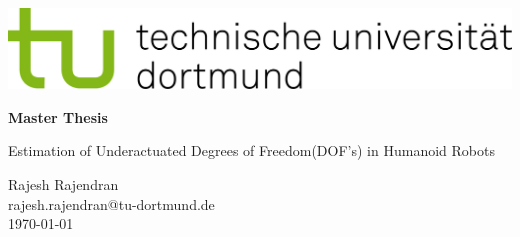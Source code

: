 \documentclass[a4paper,11pt,twoside,DIV10,english,numbers=noendperiod]{scrbook}
\newcommand{\changefont}[3]{
\fontfamily{#1} \fontseries{#2} \fontshape{#3} \selectfont}
\theoremstyle{change}
\theoremstyle{nonumberplain}
\theoremstyle{change}
\theoremstyle{nonumberplain}
\theoremstyle{change}
\theoremstyle{nonumberplain}
\begin{document}

	\setcounter{secnumdepth}{3}
	\setcounter{tocdepth}{3}

	
	\changefont{ptm}{m}{n}
	
	
\begin{titlepage}

 \sffamily

 \vspace*{-2cm}

 \begin{minipage}{0.48\linewidth}
  \includegraphics[width=1.0\textwidth]{Bilder/tud_logo_rgb}
 \end{minipage}
 
 \vspace*{5.7cm}
 \hfil
 \hfil
 \begin{minipage}{0.7\linewidth}
  \begin{center}
    \Huge\textbf{Master Thesis}
  \end{center}
  \begin{center}
    \huge{Estimation of Underactuated Degrees of Freedom(DOF's) in Humanoid Robots}\\[3ex]
  \end{center}
  \vspace{0.75cm}
  \begin{center}
    \large{Rajesh Rajendran}\\
 
 \normalsize{rajesh.rajendran@tu-dortmund.de}\\[2ex]
    \large{\today}
  \end{center}
 \end{minipage}
 \hfil
 \begin{minipage}{0.05\linewidth}
 \end{minipage}
 \begin{minipage}{0.55\linewidth}
 \end{minipage}


\end{titlepage}
\end{document}
